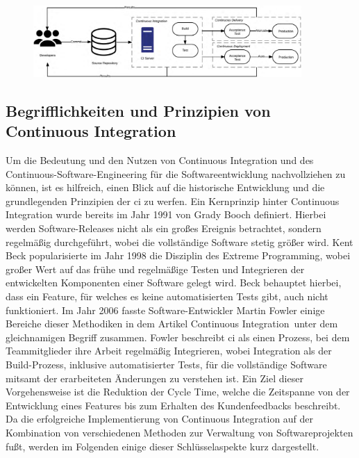 \begin{figure}[H]
    \centering
    \centerline{\includegraphics[width=0.91\textwidth]{images/content/ci-cde-cd}}
    \label{fig:ci-cde-cd}
\end{figure}

\subsection{Begrifflichkeiten und Prinzipien von Continuous Integration} \label{subsec:02-background-2}

Um die Bedeutung und den Nutzen von Continuous Integration und des Continuous-Software-Engineering für die
Softwareentwicklung nachvollziehen zu können, ist es hilfreich, einen Blick auf die historische Entwicklung und die
grundlegenden Prinzipien der \acrshort{ci} zu werfen.
Ein Kernprinzip hinter Continuous Integration wurde bereits im Jahr 1991 von Grady Booch definiert.
Hierbei werden Software-Releases nicht als ein großes Ereignis betrachtet, sondern regelmäßig durchgeführt, wobei
die vollständige Software stetig größer wird.
Kent Beck popularisierte im Jahr 1998 die Disziplin des \glqq Extreme Programming\grqq, wobei großer Wert auf das frühe
und regelmäßige Testen und Integrieren der entwickelten Komponenten einer Software gelegt wird.
Beck behauptet hierbei, dass ein Feature, für welches es keine automatisierten Tests gibt, auch nicht funktioniert.
Im Jahr 2006 fasste Software-Entwickler Martin Fowler einige Bereiche dieser Methodiken in dem Artikel
\glqq Continuous Integration\grqq\ unter dem gleichnamigen Begriff zusammen.
Fowler beschreibt \acrshort{ci} als einen Prozess, bei dem Teammitglieder ihre Arbeit regelmäßig Integrieren,
wobei Integration als der Build-Prozess, inklusive automatisierter Tests, für die vollständige Software mitsamt der
erarbeiteten Änderungen zu verstehen ist.
Ein Ziel dieser Vorgehensweise ist die Reduktion der \glqq Cycle Time\grqq, welche die Zeitspanne von der Entwicklung
eines Features bis zum Erhalten des Kundenfeedbacks beschreibt.
Da die erfolgreiche Implementierung von Continuous Integration auf der Kombination von verschiedenen Methoden zur
Verwaltung von Softwareprojekten fußt, werden im Folgenden einige dieser Schlüsselaspekte kurz dargestellt.

